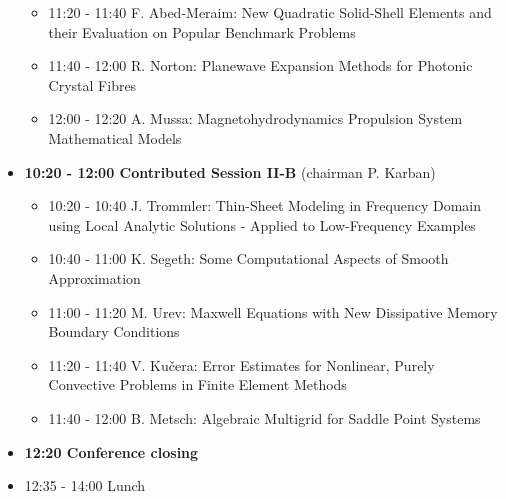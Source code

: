 \documentclass[10pt, A4]{article}%
\begin{document}
\begin{itemize}
\begin{itemize}
    \item 11:20 - 11:40 F. Abed-Meraim: New Quadratic Solid-Shell Elements and their Evaluation on Popular Benchmark Problems
    \item 11:40 - 12:00 R. Norton: Planewave Expansion Methods for Photonic Crystal Fibres
    \item 12:00 - 12:20 A. Mussa: Magnetohydrodynamics Propulsion System Mathematical Models  
  \end{itemize}
    \item {\bf 10:20 - 12:00 Contributed Session II-B} (chairman P. Karban) 
  \begin{itemize}
    \item 10:20 - 10:40 J. Trommler: Thin-Sheet Modeling in Frequency Domain using Local Analytic Solutions - Applied to Low-Frequency Examples
    \item 10:40 - 11:00 K. Segeth: Some Computational Aspects of Smooth Approximation
    \item 11:00 - 11:20 M. Urev: Maxwell Equations with New Dissipative Memory Boundary Conditions
    \item 11:20 - 11:40 V. Ku\v{c}era: Error Estimates for Nonlinear, Purely Convective Problems in Finite Element Methods
    \item 11:40 - 12:00 B. Metsch: Algebraic Multigrid for Saddle Point Systems 
  \end{itemize}
  \item {\bf 12:20 Conference closing}
  \item 12:35 - 14:00 Lunch
\end{itemize}
\end{document}

